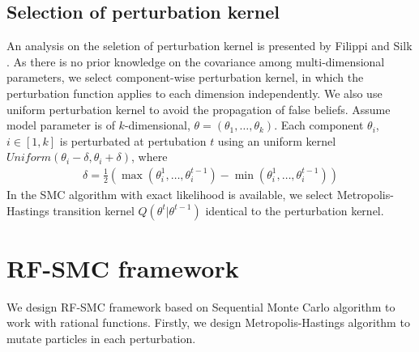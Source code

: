\subsection{Selection of perturbation kernel}
An analysis on the seletion of perturbation kernel is presented by Filippi
\cite{filippi2013optimality} and Silk \cite{silk2012optimizing}. As there is no prior knowledge on
the covariance among multi-dimensional parameters, we select component-wise perturbation kernel, in
which the perturbation function applies to each dimension independently. We also use uniform
perturbation kernel to avoid the propagation of false beliefs. Assume model parameter is of
$k$-dimensional, $\theta=(\theta_1,\ldots,\theta_k)$. Each component $\theta_i$, $i\in [1,k]$ is
perturbated at pertubation $t$ using an uniform kernel $Uniform(\theta_i-\delta, \theta_i+\delta)$, where
\begin{align*}
    \delta = \frac{1}{2}(\max(\theta^1_i,\ldots,\theta^{t-1}_i) - \min(\theta^1_i,\ldots,\theta^{t-1}_i))
\end{align*}
In the SMC algorithm with exact likelihood is available, we select Metropolis-Hastings transition
kernel $Q(\theta^t|\theta^{t-1})$ identical to the perturbation kernel.

\section{RF-SMC framework}
We design RF-SMC framework based on Sequential Monte Carlo algorithm to work with rational
functions. Firstly, we design Metropolis-Hastings algorithm to mutate particles in each
perturbation.

